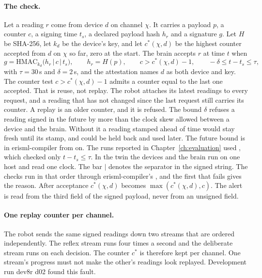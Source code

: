 \paragraph{The check.} Let a reading $r$ come from device $d$ on channel $\chi$. It carries a payload
$p$, a counter $c$, a signing time $t_s$, a declared payload hash $h_r$ and a signature $g$. Let $H$
be SHA-256, let $k_d$ be the device's key, and let $c^{*}(\chi,d)$ be the highest counter accepted
from $d$ on $\chi$ so far, zero at the start. The brain accepts $r$ at time $t$ when
\begin{equation}
g = \mathrm{HMAC}_{k_d}\bigl(h_r \,|\, c \,|\, t_s\bigr),\qquad
h_r = H(p),\qquad
c > c^{*}(\chi,d) - 1,\qquad
-\delta \le t - t_s \le \tau,
\label{eq:attest}
\end{equation}
with $\tau = 30$\,s and $\delta = 2$\,s, and the attestation names $d$ as both device and key.
The counter test $c > c^{*}(\chi,d) - 1$ admits a counter equal to the last one accepted. That is
reuse, not replay. The robot attaches its latest readings to every request, and a reading that has
not changed since the last request still carries its counter. A replay is an older counter, and it
is refused. The bound $\delta$ refuses a reading signed in the future by more than the clock skew
allowed between a device and the brain. Without it a reading stamped ahead of time would stay fresh
until its stamp, and could be held back and used later. The future bound is in erisml-compiler from
 on. The runs reported in Chapter~\ref{ch:evaluation} used , which
checked only $t - t_s \le \tau$. In the twin the devices and the brain run on one host and read
one clock.
The bar $|$ denotes the
separator in the signed string. The checks run in that order through erisml-compiler's
, and the first that fails gives the reason. After acceptance
$c^{*}(\chi,d)$ becomes $\max(c^{*}(\chi,d), c)$. The alert is read from the third field of the
signed payload, never from an unsigned field.

\paragraph{One replay counter per channel.} The robot sends the same signed readings down two streams
that are ordered independently. The reflex stream runs four times a second and the deliberate stream
runs on each decision. The counter $c^{*}$ is therefore kept per channel. One stream's progress must
not make the other's readings look replayed. Development run dev8r d02 found this fault.

